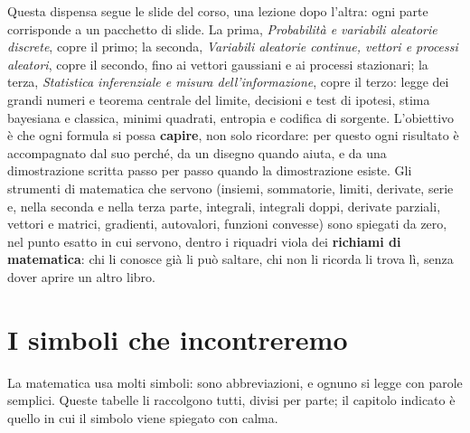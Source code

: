 Questa dispensa segue le slide del corso, una lezione dopo l'altra: ogni parte corrisponde a un pacchetto di slide.
La prima, \emph{Probabilità e variabili aleatorie discrete}, copre il primo; la seconda, \emph{Variabili aleatorie
continue, vettori e processi aleatori}, copre il secondo, fino ai vettori gaussiani e ai processi stazionari; la terza,
\emph{Statistica inferenziale e misura dell'informazione}, copre il terzo: legge dei grandi numeri e teorema centrale del
limite, decisioni e test di ipotesi, stima bayesiana e classica, minimi quadrati, entropia e codifica di sorgente.
L'obiettivo è che ogni formula si possa \textbf{capire}, non solo ricordare: per questo ogni risultato è accompagnato
dal suo perché, da un disegno quando aiuta, e da una dimostrazione scritta passo per passo quando la dimostrazione
esiste. Gli strumenti di matematica che servono (insiemi, sommatorie, limiti, derivate, serie e, nella seconda e nella
terza parte, integrali, integrali doppi, derivate parziali, vettori e matrici, gradienti, autovalori, funzioni convesse)
sono spiegati da zero, nel punto esatto in cui servono, dentro i riquadri viola dei \textbf{richiami di matematica}: chi li conosce già li può saltare, chi non li
ricorda li trova lì, senza dover aprire un altro libro.

\section{I simboli che incontreremo}

La matematica usa molti simboli: sono abbreviazioni, e ognuno si legge con parole semplici. Queste tabelle li
raccolgono tutti, divisi per parte; il capitolo indicato è quello in cui il simbolo viene spiegato con calma.

